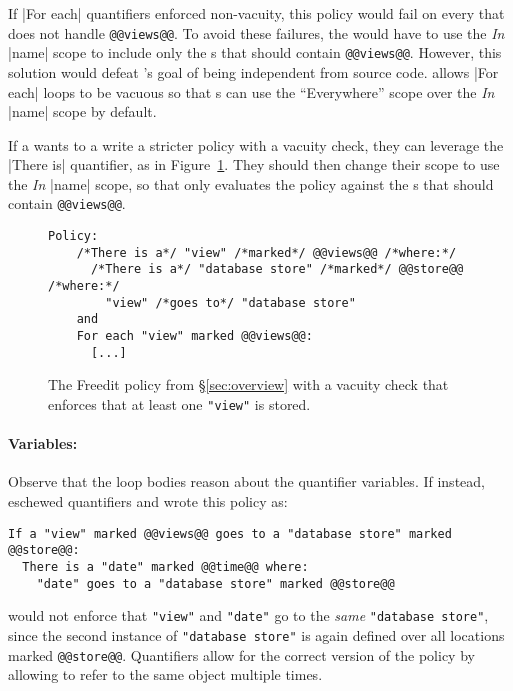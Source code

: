 If |For each| quantifiers enforced non-vacuity,
this policy would fail on every \controller{} that does not 
handle \lstinline[language=CNL]|@@views@@|.
%
To avoid these failures, the \ce{} would have to use the \emph{In} |name| scope to include
only the \controller{}s that should contain \lstinline[language=CNL]|@@views@@|.
%
However, this solution would defeat \syslang's goal of being independent from source code.
%
\syslang{} allows |For each| loops to be vacuous so that \ce{}s 
can use the ``Everywhere'' scope over the \emph{In} |name| scope by default.

If a \ce{} wants to a write a stricter policy with a vacuity check,
they can leverage the |There is| quantifier,
as in Figure~\ref{f:vacuity}.
%
They should then change their scope to use the \emph{In} |name| scope,
so that \sys{} only evaluates the policy against the \controller{}s
that should contain \lstinline[language=CNL]|@@views@@|.

\begin{figure}
  \begin{lstlisting}[language=CNL]
    Policy:
    /*There is a*/ "view" /*marked*/ @@views@@ /*where:*/
      /*There is a*/ "database store" /*marked*/ @@store@@ /*where:*/
        "view" /*goes to*/ "database store"
    and
    For each "view" marked @@views@@:
      [...]
  \end{lstlisting}
  \caption{
    The Freedit policy from \S\ref{sec:overview} with a vacuity check
    that enforces that at least one \lstinline[language=CNL]|"view"| is stored.
    }
  \label{f:vacuity}
\end{figure}

\paragraph{Variables:}
Observe that the loop bodies reason about the quantifier variables.
%
If instead, \syslang{} eschewed quantifiers and wrote this policy as:
\begin{lstlisting}[language=CNL]
If a "view" marked @@views@@ goes to a "database store" marked @@store@@:
  There is a "date" marked @@time@@ where:
    "date" goes to a "database store" marked @@store@@
\end{lstlisting}
\syslang{} would not enforce that \lstinline[language=CNL]|"view"| 
and \lstinline[language=CNL]|"date"| 
go to the \emph{same} \lstinline[language=CNL]|"database store"|,
since the second instance of \lstinline[language=CNL]|"database store"| 
is again defined over all locations marked \lstinline[language=CNL]|@@store@@|.
%
Quantifiers allow for the correct version of the policy by allowing \ces{} to refer to the same object multiple times.


